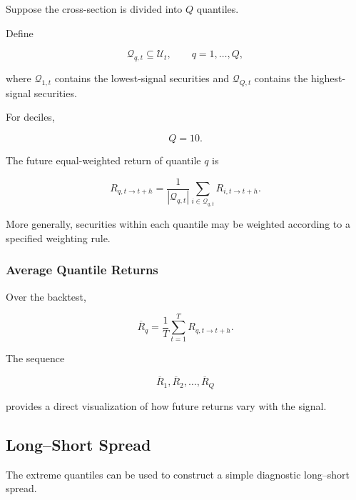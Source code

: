 \documentclass[11pt,a4paper]{article}
\begin{document}
Suppose the cross-section is divided into $Q$ quantiles.

Define

\begin{equation}
\mathcal{Q}_{q,t}
\subseteq
\mathcal{U}_t,
\qquad
q=1,\ldots,Q,
\end{equation}

where $\mathcal{Q}_{1,t}$ contains the lowest-signal securities and
$\mathcal{Q}_{Q,t}$ contains the highest-signal securities.

For deciles,

\begin{equation}
Q=10.
\end{equation}

The future equal-weighted return of quantile $q$ is

\begin{equation}
\boxed{
R_{q,t\rightarrow t+h}
=
\frac{1}{
|\mathcal{Q}_{q,t}|
}
\sum_{i\in\mathcal{Q}_{q,t}}
R_{i,t\rightarrow t+h}.
}
\end{equation}

More generally, securities within each quantile may be weighted according to a
specified weighting rule.


\subsubsection{Average Quantile Returns}

Over the backtest,

\begin{equation}
\boxed{
\overline{R}_q
=
\frac{1}{T}
\sum_{t=1}^{T}
R_{q,t\rightarrow t+h}.
}
\end{equation}

The sequence

\begin{equation}
\overline{R}_1,
\overline{R}_2,
\ldots,
\overline{R}_Q
\end{equation}

provides a direct visualization of how future returns vary with the signal.


\subsection{Long--Short Spread}
\label{subsec:signal_long_short_spread}

The extreme quantiles can be used to construct a simple diagnostic long--short
spread.
\end{document}
